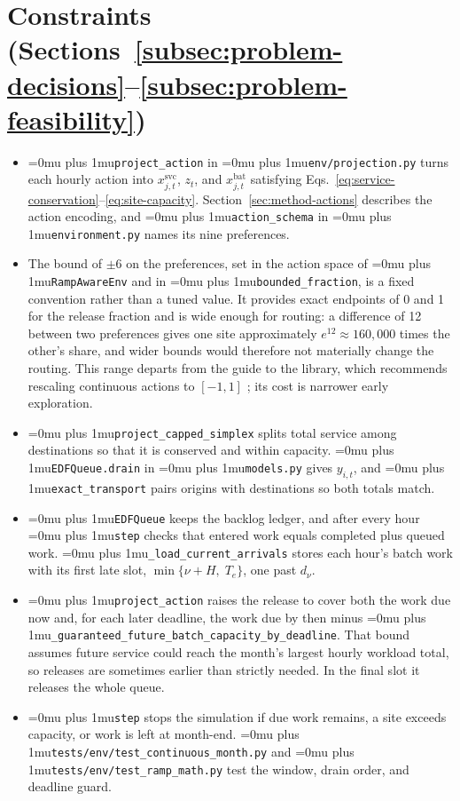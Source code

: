 \documentclass{UNCC-thesis}
\newcommand{\codepath}[1]{{\Urlmuskip=0mu plus 1mu\relax\nolinkurl{#1}}}
\begin{document}
\section{Constraints (Sections~\ref{subsec:problem-decisions}--\ref{subsec:problem-feasibility})}
\begin{itemize}
  \item \codepath{project_action} in \codepath{env/projection.py}
        turns each hourly action into \(x^{\mathrm{svc}}_{j,t}\), \(z_t\), and
        \(x^{\mathrm{bat}}_{j,t}\) satisfying
        Eqs.~\eqref{eq:service-conservation}--\eqref{eq:site-capacity}.
        Section~\ref{sec:method-actions} describes the action encoding, and
        \codepath{action_schema} in \codepath{environment.py} names its nine
        preferences.
  \item The bound of \(\pm6\) on the preferences, set in the action space of
        \codepath{RampAwareEnv} and in \codepath{bounded_fraction}, is a fixed
        convention rather than a tuned value. It provides exact endpoints of 0 and 1
        for the release fraction and is wide enough for routing: a difference of 12
        between two preferences gives one site approximately
        \(e^{12}\approx160{,}000\) times the other's share, and wider bounds would
        therefore not materially change the routing. This range departs from the guide
        to the library, which recommends rescaling continuous actions to \([-1,1]\)
        \cite{sb3tips}; its cost is narrower early exploration.
  \item \codepath{project_capped_simplex} splits total service among
        destinations so that it is conserved and within capacity.
        \codepath{EDFQueue.drain} in \codepath{models.py} gives \(y_{i,t}\),
        and \codepath{exact_transport} pairs origins with destinations so both
        totals match.
  \item \codepath{EDFQueue} keeps the backlog ledger, and after every hour
        \codepath{step} checks that entered work equals completed plus queued
        work. \codepath{_load_current_arrivals} stores each hour's batch work with its
        first late slot, \(\min\{\nu+H,\;T_e\}\), one past \(d_\nu\).
  \item \codepath{project_action} raises the release to cover both the work due
        now and, for each later deadline, the work due by then minus
        \codepath{_guaranteed_future_batch_capacity_by_deadline}. That bound
        assumes future service could reach the month's largest hourly workload
        total, so releases are sometimes earlier than strictly needed. In the
        final slot it releases the whole queue.
  \item \codepath{step} stops the simulation if due work remains, a site
        exceeds capacity, or work is left at month-end.
        \codepath{tests/env/test_continuous_month.py} and
        \codepath{tests/env/test_ramp_math.py} test the window, drain order,
        and deadline guard.
\end{itemize}
\end{document}
